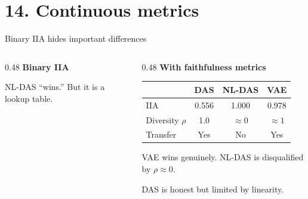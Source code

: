 \documentclass[aspectratio=169,11pt]{beamer}
\begin{document}
\hypertarget{sec14}{}
\section{14. Continuous metrics}

\begin{frame}{Binary IIA hides important differences}

\begin{columns}[T]
\begin{column}{0.48\textwidth}
\centering
\textbf{Binary IIA}

\vspace{0.3em}

{\small NL-DAS ``wins.'' But it is a lookup table.}
\end{column}
\begin{column}{0.48\textwidth}
\centering
\textbf{With faithfulness metrics}

\vspace{0.3em}
{\small\setlength{\tabcolsep}{2pt}
\begin{tabular}{lccc}
\toprule
& \textbf{DAS} & \textbf{NL-DAS} & \textbf{VAE} \\
\midrule
IIA & 0.556 & \textcolor{fail}{1.000} & \textcolor{pass}{0.978} \\
Diversity $\rho$ & 1.0 & \textcolor{fail}{$\approx 0$} & \textcolor{pass}{$\approx 1$} \\
Transfer & Yes & \textcolor{fail}{No} & \textcolor{pass}{Yes} \\
\bottomrule
\end{tabular}}

\vspace{0.5em}
{\small VAE wins genuinely. NL-DAS is disqualified by $\rho \approx 0$.}

\vspace{0.3em}
{\small DAS is honest but limited by linearity.}
\end{column}
\end{columns}
\end{frame}
\end{document}
